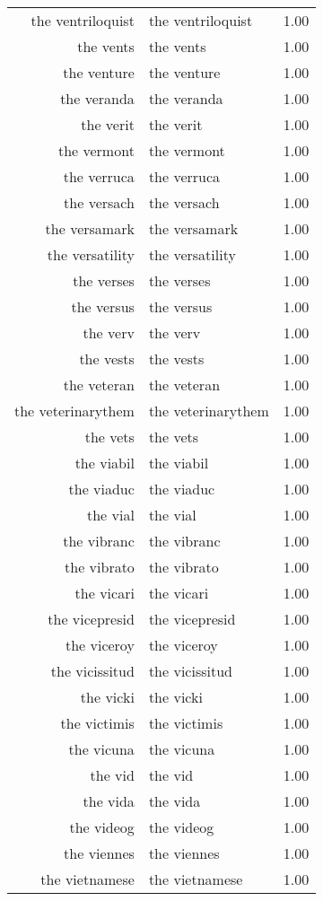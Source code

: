 \begin{table}[ht]
\begin{tabular}{rlr}
  the ventriloquist & the ventriloquist & 1.00 \\ 
  the vents & the vents & 1.00 \\ 
  the venture & the venture & 1.00 \\ 
  the veranda & the veranda & 1.00 \\ 
  the verit & the verit & 1.00 \\ 
  the vermont & the vermont & 1.00 \\ 
  the verruca & the verruca & 1.00 \\ 
  the versach & the versach & 1.00 \\ 
  the versamark & the versamark & 1.00 \\ 
  the versatility & the versatility & 1.00 \\ 
  the verses & the verses & 1.00 \\ 
  the versus & the versus & 1.00 \\ 
  the verv & the verv & 1.00 \\ 
  the vests & the vests & 1.00 \\ 
  the veteran & the veteran & 1.00 \\ 
  the veterinarythem & the veterinarythem & 1.00 \\ 
  the vets & the vets & 1.00 \\ 
  the viabil & the viabil & 1.00 \\ 
  the viaduc & the viaduc & 1.00 \\ 
  the vial & the vial & 1.00 \\ 
  the vibranc & the vibranc & 1.00 \\ 
  the vibrato & the vibrato & 1.00 \\ 
  the vicari & the vicari & 1.00 \\ 
  the vicepresid & the vicepresid & 1.00 \\ 
  the viceroy & the viceroy & 1.00 \\ 
  the vicissitud & the vicissitud & 1.00 \\ 
  the vicki & the vicki & 1.00 \\ 
  the victimis & the victimis & 1.00 \\ 
  the vicuna & the vicuna & 1.00 \\ 
  the vid & the vid & 1.00 \\ 
  the vida & the vida & 1.00 \\ 
  the videog & the videog & 1.00 \\ 
  the viennes & the viennes & 1.00 \\ 
  the vietnamese & the vietnamese & 1.00 \\ 

\end{tabular}
\end{table}
